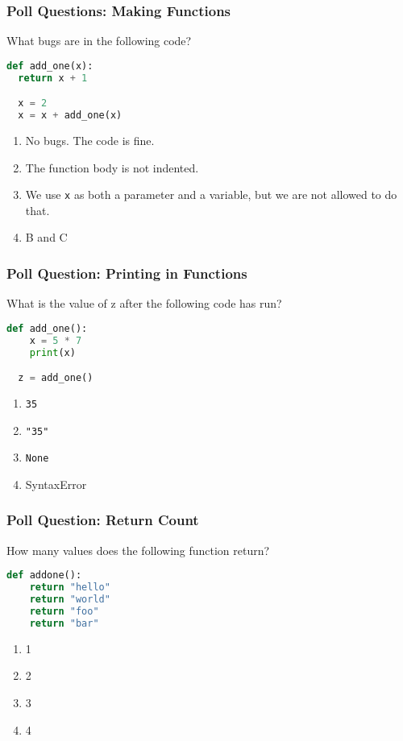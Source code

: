 \documentclass{beamer}
\begin{document}
%
%
\begin{frame}[fragile]
  \frametitle{Poll Questions: Making Functions}
  What bugs are in the following code?
  \begin{lstlisting}[language=Python, autogobble]
  def add_one(x):
  return x + 1

  x = 2
  x = x + add_one(x)
  \end{lstlisting}
  \vfill
  \begin{enumerate}[A]
    \item No bugs. The code is fine.
    \item The function body is not indented.
    \item We use \lstinline|x| as both a parameter and a variable, but we are not allowed to do that.
    \item B and C
  \end{enumerate}
\end{frame}

%
%
\begin{frame}[fragile]
  \frametitle{Poll Question: Printing in Functions} 
  What is the value of z after the following code has run?
  \begin{lstlisting}[language=Python, autogobble]
  def add_one():
    x = 5 * 7
    print(x)

  z = add_one()
  \end{lstlisting}
  \vfill
  \begin{enumerate}[A]
    \item \lstinline|35|
    \item \lstinline|"35"|
    \item \lstinline|None|
    \item SyntaxError
  \end{enumerate}
\end{frame}

%
%
\begin{frame}[fragile]
  \frametitle{Poll Question: Return Count} 
  How many values does the following function return?
  \begin{lstlisting}[language=Python, autogobble]
  def addone():
    return "hello"
    return "world"
    return "foo"
    return "bar"
  \end{lstlisting}
  \vfill
  \begin{enumerate}[A]
    \item 1
    \item 2
    \item 3
    \item 4
  \end{enumerate}
\end{frame}
\end{document}
